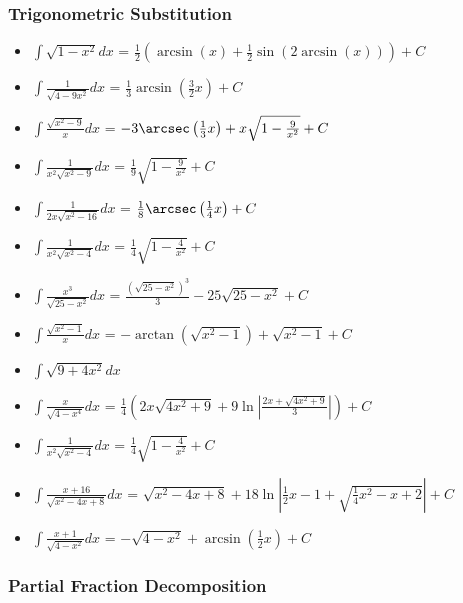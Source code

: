 \hypertarget{trigonometric-substitution}{%
\subsubsection{Trigonometric
Substitution}\label{trigonometric-substitution}}

\begin{itemize}
\tightlist
\item
  \(\displaystyle\int \sqrt{1 -x^2} dx\) =
  \(\frac{1}{2}\left(\arcsin \left(x\right)+\frac{1}{2}\sin \left(2\arcsin \left(x\right)\right)\right)+C\)
\item
  \(\displaystyle\int \frac{1}{\sqrt{4-9x^2}} dx\) =
  \(\frac{1}{3}\arcsin \left(\frac{3}{2}x\right)+C\)
\item
  \(\displaystyle\int \frac{\sqrt{x^2-9}}{x} dx\) =
  \(-3\arcsec \left(\frac{1}{3}x\right)+x\sqrt{1-\frac{9}{x^2}}+C\)
\item
  \(\displaystyle\int \frac{1}{x^2\sqrt{x^2-9}} dx\) =
  \(\frac{1}{9}\sqrt{1-\frac{9}{x^2}}+C\)
\item
  \(\displaystyle\int \frac{1}{2x\sqrt{x^2-16}} dx\) =
  \(\frac{1}{8}\arcsec \left(\frac{1}{4}x\right)+C\)
\item
  \(\displaystyle\int \frac{1}{x^2\sqrt{x^2-4}} dx\) =
  \(\frac{1}{4}\sqrt{1-\frac{4}{x^2}}+C\)
\item
  \(\displaystyle\int \frac{x^3}{\sqrt{25-x^2}} dx\) =
  \(\frac{\left(\sqrt{25-x^2}\right)^3}{3}-25\sqrt{25-x^2}+C\)
\item
  \(\displaystyle\int \frac{\sqrt{x^2-1}}{x} dx\) =
  \(-\arctan \left(\sqrt{x^2-1}\right)+\sqrt{x^2-1}+C\)
\item
  \(\displaystyle\int \sqrt{9+4x^2} dx\)
\item
  \(\displaystyle\int \frac{x}{\sqrt{4-x^4}} dx\) =
  \(\frac{1}{4}\left(2x\sqrt{4x^2+9}+9\ln \left|\frac{2x+\sqrt{4x^2+9}}{3}\right|\right)+C\)
\item
  \(\displaystyle\int \frac{1}{x^2\sqrt{x^2-4}} dx\) =
  \(\frac{1}{4}\sqrt{1-\frac{4}{x^2}}+C\)
\item
  \(\displaystyle\int \frac{x+16}{\sqrt{x^2-4x+8}} dx\) =
  \(\sqrt{x^2-4x+8}+18\ln \left|\frac{1}{2}x-1+\sqrt{\frac{1}{4}x^2-x+2}\right|+C\)
\item
  \(\displaystyle\int \frac{x+1}{\sqrt{4-x^2}} dx\) =
  \(-\sqrt{4-x^2}+\arcsin \left(\frac{1}{2}x\right)+C\)
\end{itemize}

\hypertarget{partial-fraction-decomposition}{%
\subsubsection{Partial Fraction
Decomposition}\label{partial-fraction-decomposition}}

